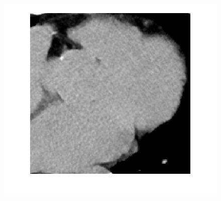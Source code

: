 \documentclass[hyperref]{ctexart}
\begin{document}
{\begin{figure}[htbp]
{				\includegraphics[scale=0.2]{111-2.png}
			}
			\quad
			\quad
			\subfigure[pic1.]{
}
\end{figure}}
\end{document}
